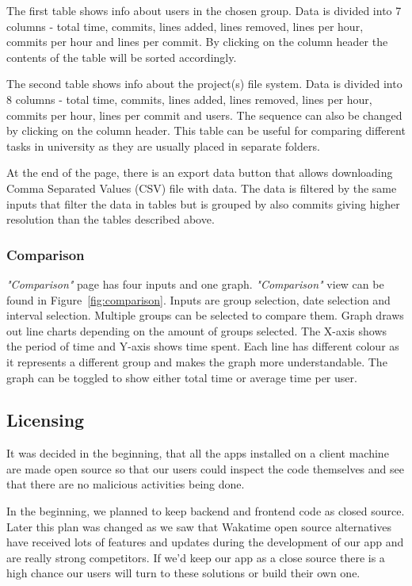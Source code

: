 The first table shows info about users in the chosen group.
Data is divided into 7 columns - total time, commits, lines added, lines removed, lines per hour, commits per hour and lines per commit. %
By clicking on the column header the contents of the table will be sorted accordingly.

The second table shows info about the project(s) file system.
Data is divided into 8 columns - total time, commits, lines added, lines removed, lines per hour, commits per hour, lines per commit and users. %
The sequence can also be changed by clicking on the column header.
This table can be useful for comparing different tasks in university as they are usually placed in separate folders.

At the end of the page, there is an export data button that allows downloading Comma Separated Values (CSV) file with data.
The data is filtered by the same inputs that filter the data in tables but is grouped
by also commits giving higher resolution than the tables described above.


\subsubsection{Comparison}\label{subsubsec:comparison}
\textit{"Comparison"} page has four inputs and one graph.
\textit{"Comparison"} view can be found in Figure~\ref{fig:comparison}.
Inputs are group selection, date selection and interval selection.
Multiple groups can be selected to compare them.
Graph draws out line charts depending on the amount of groups selected.
The X-axis shows the period of time and Y-axis shows time spent.
Each line has different colour as it represents a different group and makes the graph more understandable.
The graph can be toggled to show either total time or average time per user.

\subsection{Licensing}\label{subsec:licencing}
It was decided in the beginning, that all the apps installed on a client machine are made open source so that
our users could inspect the code themselves and see that there are no malicious activities being done.

In the beginning, we planned to keep backend and frontend code as closed source.
Later this plan was changed as we saw that Wakatime open source alternatives have received lots of features and updates
during the development of our app and are really strong competitors.
If we'd keep our app as a close source there is a high chance our users will turn to these solutions or build their own one.


